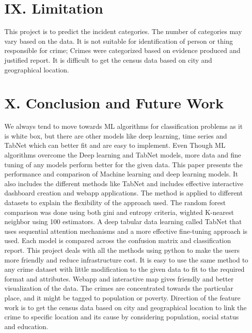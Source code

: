 \documentclass[11 pt,conference,final,]{IEEEtran}
\begin{document}
\section{IX. Limitation}\label{ix.-limitation}

This project is to predict the incident categories. The number of
categories may vary based on the data. It is not suitable for
identification of person or thing responsible for crime; Crimes were
categorized based on evidence produced and justified report. It is
difficult to get the census data based on city and geographical
location.

\section{X. Conclusion and Future
Work}\label{x.-conclusion-and-future-work}

We always tend to move towards ML algorithms for classification problems
as it is white box, but there are other models like deep learning, time
series and TabNet which can better fit and are easy to implement. Even
Though ML algorithms overcome the Deep learning and TabNet models, more
data and fine tuning of any models perform better for the given data.
This paper presents the performance and comparison of Machine learning
and deep learning models. It also includes the different methods like
TabNet and includes effective interactive dashboard creation and webapp
applications. The method is applied to different datasets to explain the
flexibility of the approach used. The random forest comparison was done
using both gini and entropy criteria, wighted K-nearest neighbor using
100 estimators. A deep tabular data learning called TabNet that uses
sequential attention mechanisms and a more effective fine-tuning
approach is used. Each model is compared across the confusion matrix and
classification report. This project deals with all the methods using
python to make the users more friendly and reduce infrastructure cost.
It is easy to use the same method to any crime dataset with little
modification to the given data to fit to the required format and
attributes. Webapp and interactive map gives friendly and better
visualization of the data. The crimes are concentrated towards the
particular place, and it might be tagged to population or poverty.
Direction of the feature work is to get the census data based on city
and geographical location to link the crime to specific location and its
cause by considering population, social status and education.
\end{document}
